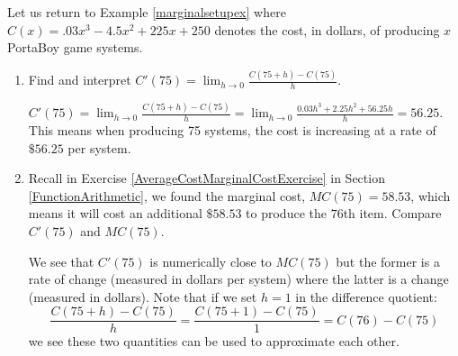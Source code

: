 \documentclass{ximera}
\begin{document}
\begin{problem} \label{MarginalCostDerivativeExercise} Let us return to Example \ref{marginalsetupex} where  $C(x) = .03x^{3} - 4.5x^{2} + 225x + 250$ denotes the cost, in dollars,  of producing $x$ PortaBoy game systems.

\begin{enumerate}

\item  Find and interpret $C'(75) = \lim_{h \rightarrow 0} \frac{C(75+h) - C(75)}{h}$.

\begin{solution}
$C'(75) = \lim_{h \rightarrow 0} \frac{C(75+h) - C(75)}{h}  =     \lim_{h \rightarrow 0} \frac{0.03h^{3}+2.25h^{2}+56.25h}{h} = 56.25$.  This means when producing 75 systems, the cost is increasing at a rate of $\$ 56.25$ per system.
\end{solution}

\item  Recall in Exercise \ref{AverageCostMarginalCostExercise} in Section \ref{FunctionArithmetic}, we found the marginal cost, $MC(75) = 58.53$,   which means it will cost an additional $\$ 58.53$ to produce the $76$th item.  Compare $C'(75)$ and $MC(75)$.

\begin{solution}
We see that $C'(75)$ is numerically close to $MC(75)$ but the former is a rate of change (measured in dollars per system) where the latter is a change (measured in dollars).  Note that if we set  $h = 1$ in the difference quotient:  \[\frac{C(75+h) - C(75)}{h} = \frac{C(75+1) - C(75)}{1} = C(76) - C(75)\] we see these two quantities can be used to approximate each other.
\end{solution}

\end{enumerate}

\end{problem}
\end{document}
